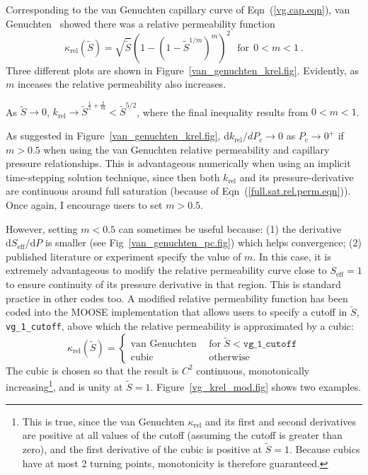 \documentclass[]{scrreprt}
\begin{document}
Corresponding to the van Genuchten capillary curve of
Eqn~(\ref{vg.cap.eqn}), van Genuchten~\cite{vangenucthen1980} showed
there was a relative permeability function
\begin{equation}
\kappa_{\mathrm{rel}}(\tilde{S}) = \sqrt{\tilde{S}} \left( 1- \left(1 -
\tilde{S}^{1/m}\right)^{m} \right)^{2}
 \ \ \ \mbox{for}\ \ 0<m<1 \ .
\label{vg.krel.eqn}
\end{equation}
Three different plots are shown in
Figure~\ref{van_genuchten_krel.fig}.  Evidently, as $m$ inceases the
relative permeability also increases.

As $\tilde{S}\rightarrow 0$, $k_{\mathrm{rel}} \rightarrow \tilde{S}^{\frac{1}{2} +
  \frac{2}{m}} < \tilde{S}^{5/2}$, where the final inequality results from
$0<m<1$.

As suggested in Figure~\ref{van_genuchten_krel.fig},
$\mathrm{d}k_{\mathrm{rel}}/d P_{c} \rightarrow 0$ as
$P_{c}\rightarrow 0^{+}$ if $m>0.5$ when using the van Genuchten
relative permeability and capillary pressure relationships.  This is
advantageous numerically when using an implicit time-stepping solution
technique, since then both $k_{\mathrm{rel}}$ and its
pressure-derivative are continuous around full saturation (because of
Eqn~(\ref{full.sat.rel.perm.eqn})).  Once again, I encourage users to
set $m>0.5$.

However, setting $m<0.5$ can sometimes be useful because: (1) the
derivative $\mathrm{d}S_{\mathrm{eff}}/\mathrm{d} P$ is smaller (see
Fig~\ref{van_genuchten_pc.fig}) which helps convergence; (2) published
literature or experiment specify the value of $m$.  In this case, it
is extremely advantageous to modify the relative permeability curve
close to $S_{\mathrm{eff}}=1$ to ensure continuity of its pressure
derivative in that region.  This is standard practice in other codes
too.  A modified relative permeability function has been coded into
the MOOSE implementation that allows users to specify a cutoff in $\tilde{S}$, {\tt
  vg\_1\_cutoff}, above which the relative permeability is
approximated by a cubic:
\begin{equation}
\kappa_{\mathrm{rel}}(\tilde{S}) = \left\{
\begin{array}{ll}
\mbox{van Genuchten} & \ \ \mbox{for }
\tilde{S}<\mathtt{vg\_1\_cutoff} \\
\mbox{cubic} & \ \ \mbox{otherwise}
\end{array}
\right.
\label{eqn.mod_vg_1}
\end{equation}
The cubic is chosen so that the result is $C^{2}$ continuous,
monotonically increasing\footnote{This is true, since the van
  Genuchten $\kappa_{\mathrm{rel}}$ and its first and second
  derivatives are positive at all values of the cutoff (assuming the
  cutoff is greater than zero), and the first derivative of the cubic
  is positive at $\tilde{S}=1$.  Because cubics have at most 2 turning
  points, monotonicity is therefore guaranteed.}, and is unity at
$\tilde{S}=1$.  Figure~\ref{vg_krel_mod.fig} shows two examples.
\end{document}
